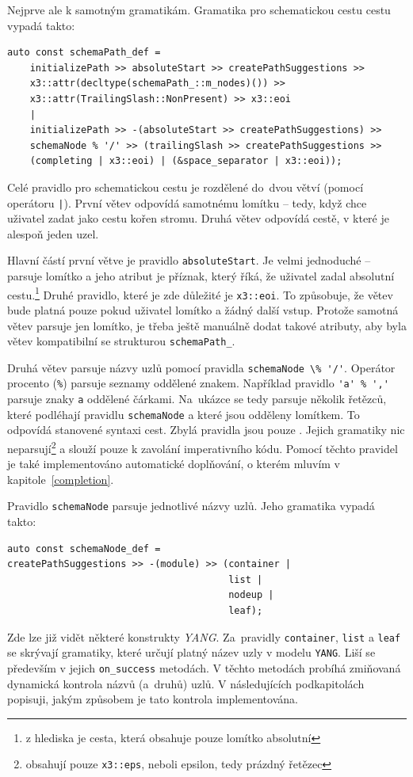 \documentclass[thesis=B,czech,hidelinks]{FITthesis}[2019/03/06]
\begin{document}
Nejprve ale k samotným gramatikám. Gramatika pro schematickou cestu cestu vypadá takto:
\begin{verbatim}
auto const schemaPath_def =
    initializePath >> absoluteStart >> createPathSuggestions >>
    x3::attr(decltype(schemaPath_::m_nodes)()) >>
    x3::attr(TrailingSlash::NonPresent) >> x3::eoi
    |
    initializePath >> -(absoluteStart >> createPathSuggestions) >>
    schemaNode % '/' >> (trailingSlash >> createPathSuggestions >>
    (completing | x3::eoi) | (&space_separator | x3::eoi));

\end{verbatim}
Celé pravidlo pro schematickou cestu je rozdělené do~dvou větví (pomocí operátoru \texttt{|}). První větev odpovídá samotnému lomítku -- tedy, když chce uživatel zadat jako cestu kořen stromu. Druhá větev odpovídá cestě, v které je alespoň jeden uzel.

Hlavní částí první větve je pravidlo \texttt{absoluteStart}. Je velmi jednoduché -- parsuje lomítko a jeho atribut je příznak, který říká, že uživatel zadal absolutní cestu.\footnote{z hlediska  je cesta, která obsahuje pouze lomítko absolutní} Druhé pravidlo, které je zde důležité je \texttt{x3::eoi}. To způsobuje, že větev bude platná pouze pokud uživatel lomítko a žádný další vstup. Protože samotná větev parsuje jen lomítko, je třeba ještě manuálně dodat takové atributy, aby byla větev kompatibilní se strukturou \texttt{schemaPath\_}.

Druhá větev parsuje názvy uzlů pomocí pravidla \verb¨schemaNode \% '/'¨. Operátor procento (\texttt{\%}) parsuje seznamy oddělené znakem. Například pravidlo \verb¨'a' % ','¨ parsuje znaky \texttt{a} oddělené čárkami. Na~ukázce se tedy parsuje několik řetězců, které podléhají pravidlu \texttt{schemaNode} a které jsou odděleny lomítkem. To odpovídá stanovené syntaxi cest. Zbylá pravidla jsou pouze . Jejich gramatiky nic neparsují\footnote{obsahují pouze \texttt{x3::eps}, neboli epsilon, tedy prázdný řetězec} a slouží pouze k zavolání imperativního kódu. Pomocí těchto pravidel je také implementováno automatické doplňování, o kterém mluvím v kapitole~\ref{completion}.

Pravidlo \texttt{schemaNode} parsuje jednotlivé názvy uzlů. Jeho gramatika vypadá takto:
\begin{verbatim}
auto const schemaNode_def =
createPathSuggestions >> -(module) >> (container |
                                       list |
                                       nodeup |
                                       leaf);
\end{verbatim}
Zde lze již vidět některé konstrukty \textit{YANG}. Za~pravidly \texttt{container}, \texttt{list} a \texttt{leaf} se skrývají gramatiky, které určují platný název uzly v modelu \texttt{YANG}. Liší se především v jejich \verb¨on_success¨ metodách. V těchto metodách probíhá zmiňovaná dynamická kontrola názvů (a~druhů) uzlů. V následujících podkapitolách popisuji, jakým způsobem je tato kontrola implementována.
\end{document}
